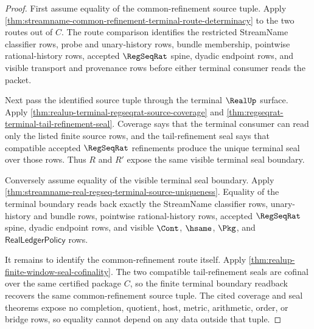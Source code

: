 \begin{proof}
First assume equality of the common-refinement source tuple. Apply
\autoref{thm:streamname-common-refinement-terminal-route-determinacy} to the
two routes out of $C$. The route comparison identifies the restricted
StreamName classifier rows, probe and unary-history rows, bundle membership,
pointwise rational-history rows, accepted $\RegSeqRat$ spine, dyadic endpoint
rows, and visible transport and provenance rows before either terminal
consumer reads the packet.

Next pass the identified source tuple through the terminal $\RealUp$ surface.
Apply \autoref{thm:realup-terminal-regseqrat-source-coverage} and
\autoref{thm:regseqrat-terminal-tail-refinement-seal}. Coverage says that the
terminal consumer can read only the listed finite source rows, and the
tail-refinement seal says that compatible accepted $\RegSeqRat$ refinements
produce the unique terminal seal over those rows. Thus $R$ and $R'$ expose the
same visible terminal seal boundary.

Conversely assume equality of the visible terminal seal boundary. Apply
\autoref{thm:streamname-real-regseq-terminal-source-uniqueness}. Equality of
the terminal boundary reads back exactly the StreamName classifier rows,
unary-history and bundle rows, pointwise rational-history rows, accepted
$\RegSeqRat$ spine, dyadic endpoint rows, and visible $\Cont$, $\hsame$,
$\Pkg$, and $\mathsf{RealLedgerPolicy}$ rows.

It remains to identify the common-refinement route itself. Apply
\autoref{thm:realup-finite-window-seal-cofinality}. The two compatible
tail-refinement seals are cofinal over the same certified package $C$, so the
finite terminal boundary readback recovers the same common-refinement source
tuple. The cited coverage and seal theorems expose no completion, quotient,
host, metric, arithmetic, order, or bridge rows, so equality cannot depend on
any data outside that tuple.
\end{proof}

